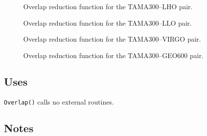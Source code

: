\documentclass{article}
\begin{document}
%
%
\begin{figure}[htb!]
\begin{center}
{}
\caption{\label{f:TAMA300LHO}
Overlap reduction function for the TAMA300--LHO pair.}
\end{center}
\end{figure}
%
%
\begin{figure}[htb!]
\begin{center}
{}
\caption{\label{f:TAMA300LLO}
Overlap reduction function for the TAMA300--LLO pair.}
\end{center}
\end{figure}
%
%
\begin{figure}[htb!]
\begin{center}
{}
\caption{\label{f:TAMA300VIRGO}
Overlap reduction function for the TAMA300--VIRGO pair.}
\end{center}
\end{figure}
%
%
\begin{figure}[htb!]
\begin{center}
{}
\caption{\label{f:TAMA300GEO600}
Overlap reduction function for the TAMA300--GEO600 pair.}
\end{center}
\end{figure}
%

\subsection{Uses}

{\tt Overlap()\/} calls no external routines.

\subsection{Notes}
\end{document}
